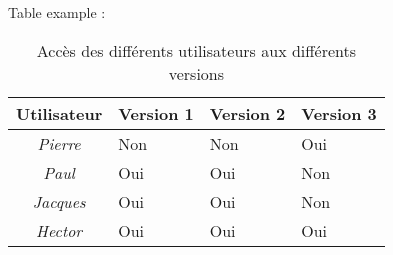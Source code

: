 Table example : 

\begin{table}[H] %
\centering
\begin{tabular}{|c|l|l|l|}
\hline
\textbf{Utilisateur} & \multicolumn{1}{c|}{\textbf{Version 1}} & \multicolumn{1}{c|}{\textbf{Version 2}} & \multicolumn{1}{c|}{\textbf{Version 3}} \\ \hline
\textit{Pierre} & Non & Non & Oui \\ \hline
\textit{Paul} & Oui & Oui & Non \\ \hline
\textit{Jacques} & Oui & Oui & Non \\ \hline
\textit{Hector} & Oui & Oui & Oui \\ \hline
\end{tabular}
\caption{Accès des différents utilisateurs aux différents versions}
\label{tab:versions}
\end{table}